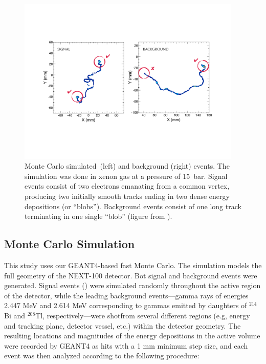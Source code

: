 \documentclass[a4paper,11pt]{article}
\begin{document}
\begin{figure}[!htb]
	\centering
	\includegraphics[width= 0.95\textwidth]{fig/TrackSignature.pdf}
	\caption{Monte Carlo simulated \bbonu\,(left) and background (right) events.  The simulation was done in xenon gas at a pressure of 15~bar. Signal events consist of two electrons emanating
		from a common vertex, producing two initially smooth tracks ending in two dense energy depositions (or ``blobs'').  Background events consist of one long track terminating in one
		single ``blob'' (figure from \cite{MartinAlbo_thesis}).} \label{fig.ETRK2}
\end{figure}

\subsection{Monte Carlo Simulation}\label{ssec:NEXT100MC}
This study uses our GEANT4-based \cite{GEANT4} fast Monte Carlo. The simulation models the full geometry of the NEXT-100 detector.  Bot signal and background events were generated. Signal events (\bbonu) were
simulated randomly throughout the active region of the detector, while the leading background events---gamma rays of energies 2.447 MeV and 2.614 MeV corresponding to gammas emitted by daughters of $^{214}$Bi and $^{208}$Tl,
respectively---were shotfrom several different regions (e.g, energy and tracking plane, detector vessel, etc.) within the detector geometry. %
The resulting locations and magnitudes of the energy depositions in the active volume were recorded by GEANT4 as hits with a 1 mm minimum step size, and each event was then
analyzed according to the following procedure:
\end{document}
